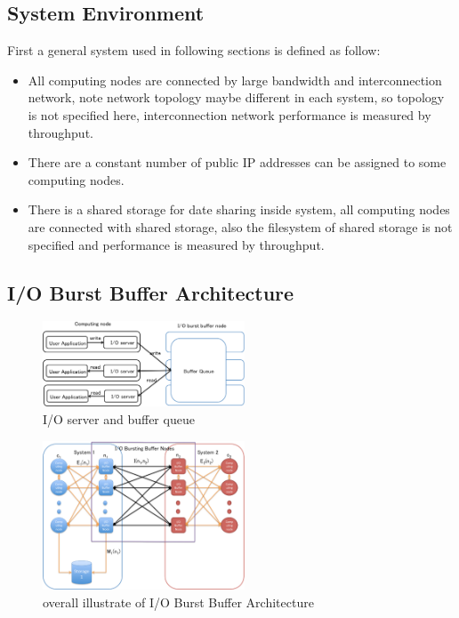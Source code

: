 \documentclass[JIP,draft]{ipsj}
\begin{document}
\subsection{System Environment}
First a general system used in following sections is defined as follow:

\begin{itemize}
	\item All computing nodes are connected by large bandwidth and interconnection network, note network topology maybe different in each system, so topology is not specified here, interconnection network performance is measured by throughput.
	\item There are a constant number of public IP addresses can be assigned to some computing nodes.
	\item There is a shared storage for date sharing inside system, all computing nodes are connected with shared storage, also the filesystem of shared storage is not specified and performance is measured by throughput.
\end{itemize}

\subsection{I/O Burst Buffer Architecture}

\begin{figure}[tb]
	\centering
	\includegraphics[width=6cm]{IOserver}
	\caption{I/O server and buffer queue}
	\label{I/O server}
\end{figure}

\begin{figure}[tb]
	\centering
	\includegraphics[width=6cm]{overview}
	\caption{overall illustrate of I/O Burst Buffer Architecture}
	\label{overview}
\end{figure}
\end{document}
